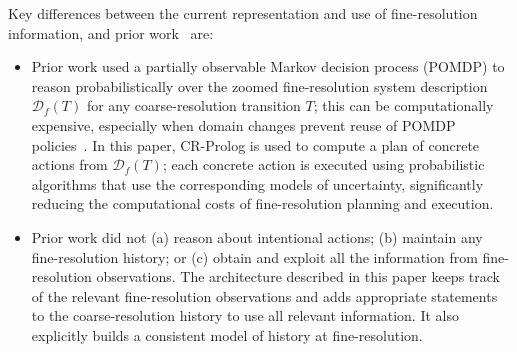 \documentclass[letterpaper, 10 pt, conference]{ieeeconf}  %
\begin{document}
Key differences between the current representation and use of
fine-resolution information, and prior
work~\cite{sridharan2017refinement} are:
\begin{itemize}
\item Prior work used a partially observable Markov decision process
  (POMDP) to reason probabilistically over the zoomed fine-resolution
  system description $\mathcal{D}_f(T)$ for any coarse-resolution
  transition $T$; this can be computationally expensive, especially
  when domain changes prevent reuse of POMDP
  policies~\cite{sridharan2017refinement}. In this paper, CR-Prolog is
  used to compute a plan of concrete actions from $\mathcal{D}_f(T)$;
  each concrete action is executed using probabilistic algorithms that
  use the corresponding models of uncertainty, significantly reducing
  the computational costs of fine-resolution planning and execution.

\item Prior work did not (a) reason about intentional actions; (b)
  maintain any fine-resolution history; or (c) obtain and exploit all
  the information from fine-resolution observations. The architecture
  described in this paper keeps track of the relevant fine-resolution
  observations and adds appropriate statements to the
  coarse-resolution history to use all relevant information. It also
  explicitly builds a consistent model of history at fine-resolution.
\end{itemize}


\end{document}
